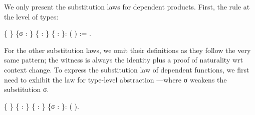   We only present the substitution laws for dependent products. First,
  the rule at the level of types:
 \begin{coqdoccode}
\coqdocemptyline
\coqdocnoindent
{}  \{ \} \{σ : \coqdocnotation{[} \coqdocnotation{$\longrightarrow$} \coqdocnotation{]}\} \{ :  \} \{ :  \}:\coqdoceol
\coqdocindent{1.00em}
      ( \coqdocnotation{$\circ$} ) := \coqdocnotation{(}   \coqdocvar{\_}\coqdocnotation{;}   \coqdocnotation{)}.\coqdoceol
\coqdocemptyline
\end{coqdoccode}
For the other substitution laws, we omit their definitions as they
  follow the very same pattern; the witness is always the identity plus
  a proof of naturality wrt context change. To express the
  substitution law of dependent functions, we first need to exhibit the
  law for type-level abstraction \coqdocdefinition{$\Lambda$}---where  σ weakens the
  substitution σ.  \begin{coqdoccode}
\coqdocemptyline
\coqdocnoindent
{}  \{ \} \{ :  \} \{ :  \} \{σ : \coqdocnotation{[} \coqdocnotation{$\longrightarrow$} \coqdocnotation{]}\}:\coqdoceol
\coqdocindent{1.00em}
\coqdocdefinition{$\Lambda$}  \coqdocnotation{$\circ$}   \coqdocdefinition{$\Lambda$} (   ).\coqdoceol
\coqdocemptyline
\end{coqdoccode}
